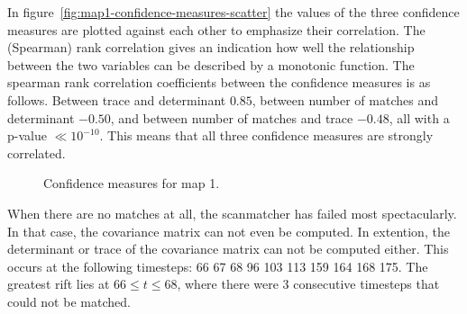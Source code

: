 In figure~\ref{fig:map1-confidence-measures-scatter} the values of the three confidence measures are plotted against each other to emphasize their correlation. The (Spearman) rank correlation gives an indication how well the relationship between the two variables can be described by a monotonic function. The spearman rank correlation coefficients between the confidence measures is as follows. Between trace and determinant $0.85$, between number of matches and determinant $-0.50$, and between number of matches and trace $-0.48$, all with a p-value $\ll 10^{-10}$. This means that all three confidence measures are strongly correlated.

\begin{figure}[ht]
  \centering
  \caption{Confidence measures for map 1.}
  \label{fig:map1-confidence-measures}
\end{figure}

When there are no matches at all, the scanmatcher has failed most spectacularly. In that case, the covariance matrix can not even be computed. In extention, the determinant or trace of the covariance matrix can not be computed either. This occurs at the following timesteps: 66  67  68  96 103 113 159 164 168 175. The greatest rift lies at $66 \le t \le68$, where there were 3 consecutive timesteps that could not be matched. 

